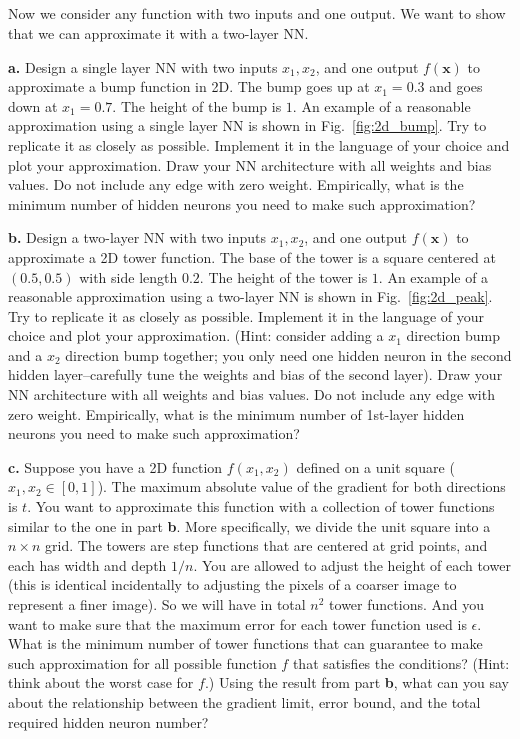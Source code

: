 \documentclass{article}
\begin{document}
\subsection{}
Now we consider any function with two inputs and one output. We want to show that we can approximate it with a two-layer NN. 

\textbf{a.} Design a single layer NN with two inputs $x_1, x_2$, and one output $f(\textbf{x})$ to approximate a bump function in 2D. The bump goes up at $x_1 = 0.3$ and goes down at $x_1 = 0.7$. The height of the bump is $1$. An example of a reasonable approximation using a single layer NN is shown in Fig.~\ref{fig:2d_bump}. Try to replicate it as closely as possible. Implement it in the language of your choice and plot your approximation. Draw your NN architecture with all weights and bias values. Do not include any edge with zero weight. Empirically, what is the minimum number of hidden neurons you need to make such approximation? 

\textbf{b.} Design a two-layer NN with two inputs $x_1, x_2$, and one output $f(\textbf{x})$ to approximate a 2D tower function. The base of the tower is a square centered at $(0.5, 0.5)$ with side length $0.2$. The height of the tower is $1$. An example of a reasonable approximation using a two-layer NN is shown in Fig.~\ref{fig:2d_peak}. Try to replicate it as closely as possible. Implement it in the language of your choice and plot your approximation. (Hint: consider adding a $x_1$ direction bump and a $x_2$ direction bump together; you only need one hidden neuron in the second hidden layer--carefully tune the weights and bias of the second layer). Draw your NN architecture with all weights and bias values. Do not include any edge with zero weight. Empirically, what is the minimum number of 1st-layer hidden neurons you need to make such approximation? 

\textbf{c.} Suppose you have a 2D function $f(x_1, x_2)$ defined on a unit square ($x_1, x_2 \in \left [0,1 \right ]$). The maximum absolute value of the gradient for both directions is $t$. You want to approximate this function with a collection of tower functions similar to the one in part \textbf{b}. More specifically, we divide the unit square into a $n\times n$ grid. The towers are step functions that are centered at grid points, and each has width and depth $1/n$. You are allowed to adjust the height of each tower (this is identical incidentally to adjusting the pixels of a coarser image to represent a finer image). So we will have in total $n^2$ tower functions. And you want to make sure that the maximum error for each tower function used is $\epsilon$. What is the minimum number of tower functions that can guarantee to make such approximation for all possible function $f$ that satisfies the conditions? (Hint: think about the worst case for $f$.) Using the result from part \textbf{b}, what can you say about the relationship between the gradient limit, error bound, and the total required hidden neuron number?
\end{document}
